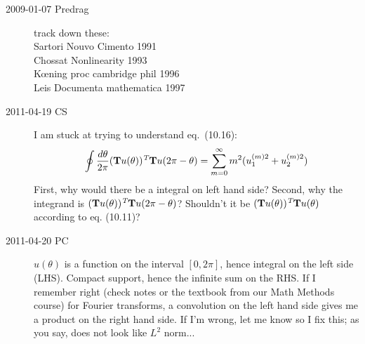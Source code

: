 \begin{description}
\item[2009-01-07 Predrag] track down these: \\
Sartori Nouvo Cimento 1991 \\
Chossat Nonlinearity 1993  \\
K{\oe}ning proc cambridge phil 1996 \\
Leis Documenta mathematica 1997

\item[2011-04-19 CS]
I am stuck at trying to understand eq.~(10.16):
\[
\oint\frac{d\theta}{2\pi}(\textbf{T}u(\theta))^{\emph{T}}\textbf{T}u(2\pi-\theta)
 = \sum\limits_{m=0}^{\infty}m^{2}(u_{1}^{(m)2}+u_{2}^{(m)2})
\]
First, why would there be a integral on left hand side? Second, why the
integrand is $(\textbf{T}u(\theta))^{\emph{T}}\textbf{T}u(2\pi-\theta)$?
Shouldn't it be $(\textbf{T}u(\theta))^{\emph{T}}\textbf{T}u(\theta)$
according to eq. (10.11)?

\item[2011-04-20 PC] $u(\theta)$ is a function on the interval $[0,2\pi]$,
hence integral on the left side (LHS). Compact support, hence the infinite sum
on the RHS. If I remember right (check notes or the textbook from
our Math Methods course) for Fourier transforms, a convolution on the
left hand side gives me a product on the right hand side. If I'm wrong,
let me know so I fix this; as you say, does not look like $L^2$ norm...

\end{description}

%


